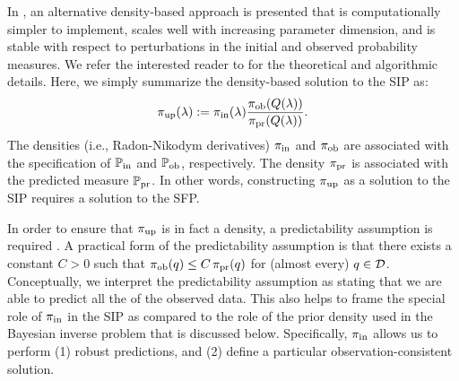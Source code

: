 In \cite{BJW18a}, an alternative density-based approach is presented that is computationally simpler to implement, scales well with increasing parameter dimension, and is stable with respect to perturbations in the initial and observed probability measures.
We refer the interested reader to \cite{BJW18a} for the theoretical and algorithmic details.
Here, we simply summarize the density-based solution to the SIP as:
\begin{equation}\label{eq:updated-pdf}
	\operatorname*{\pi_{up}}(\lambda) := \operatorname*{\pi_{in}}(\lambda)\frac{\operatorname*{\pi_{ob}}(Q(\lambda))}{\operatorname*{\pi_{pr}}(Q(\lambda))}.
\end{equation}
The densities (i.e., Radon-Nikodym derivatives) $\operatorname*{\pi_{in}}$ and $\operatorname*{\pi_{ob}}$ are associated with the specification of $\operatorname*{\mathbb{P}_{in}}$ and $\operatorname*{\mathbb{P}_{ob}}$, respectively.
The density $\operatorname*{\pi_{pr}}$ is associated with the predicted measure $\operatorname*{\mathbb{P}_{pr}}$.
In other words, constructing $\operatorname*{\pi_{up}}$ as a solution to the SIP requires a solution to the SFP.

In order to ensure that $\operatorname*{\pi_{up}}$ is in fact a density, a predictability assumption is required \cite{BJW18a}.
A practical form of the predictability assumption is that there exists a constant $C>0$ such that $\operatorname*{\pi_{ob}}(q)\leq C\operatorname*{\pi_{pr}}(q)$ for (almost every) $q\in\mathcal{D}$.
Conceptually, we interpret the predictability assumption as stating that we are able to predict all the of the observed data.
This also helps to frame the special role of $\operatorname*{\pi_{in}}$ in the SIP as compared to the role of the prior density used in the Bayesian inverse problem that is discussed below.
Specifically, $\operatorname*{\pi_{in}}$ allows us to perform (1) robust predictions, and (2) define a particular observation-consistent solution.

